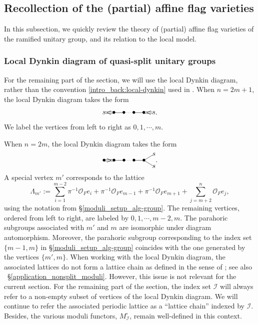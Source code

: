 \documentclass[pdflatex,sn-mathphys-num]{sn-jnl}%
\theoremstyle{thmstyleone}%
\theoremstyle{thmstyletwo}%
\numberwithin{equation}{subsection}
\theoremstyle{thmstylethree}%
\newcommand{\CI}{\ensuremath{\mathcal{I}}\xspace}
\newcommand{\CO}{\ensuremath{\mathcal{O}}\xspace}
\begin{document}
\subsection{Recollection of the (partial) affine flag varieties}
In this subsection, we quickly review the theory of (partial) affine flag varieties of the ramified unitary group, and its relation to the local model.
		
\subsubsection{Local Dynkin diagram of quasi-split unitary groups}\label{general_dyn}
For the remaining part of the section, we will use the local Dynkin diagram, rather than the convention \eqref{intro_back:local-dynkin} used in \cite[4.a]{PR2008}.
When $n=2m+1$, the local Dynkin diagram takes the form
\begin{equation*}
	\xy 
	(-10,0)*{s}="s1";
	(-5,0)*{\bullet};
	(0,0)*{\bullet};
	(5,0)*{\bullet};
	(10,0)*{\bullet};
	(15,0)*{s}="s2";
	(-7.5,0)*{<};
	(12.5,0)*{<};
	{\ar@2{-} "s1";(-5,0)};
	{\ar@{-} (-5,0);(0,0)};
	{\ar@{.} (0,0);(5,0)};
	{\ar@{-} (5,0);(10,0)};
	{\ar@2{-} (10,0);"s2"};
	\endxy.
\end{equation*}
We label the vertices from left to right as $0,1,\cdots,m$.
		
When $n=2m$, the local Dynkin diagram takes the form 
\begin{equation*}
	\xy 
	(-10,0)*{\bullet}="v1";
	(-5,0)*{\bullet}="v2";
	(0,0)*{\bullet}="v3";
	(5,0)*{\bullet}="v4";
	(10,0)*{\bullet}="v5";
	(15,3)*{s}="s1";
	(15,-3)*{s}="s2";
	(-7.5,0)*{>};
	{\ar@2{-} (-10,0);(-5,0)};
	{\ar@{-} (-5,0);(0,0)};
	{\ar@{.} (0,0);(5,0)};
	{\ar@{-} (5,0);(10,0)};
	{\ar@{-} (10,0);"s1"};
	{\ar@{-} (10,0);"s2"};
	\endxy.
\end{equation*}
A special vertex $m'$ corresponds to the lattice
\begin{equation*}
	\Lambda_{m'}:=\sum_{i=1}^{m-2}\pi^{-1}\CO_F e_i+\pi^{-1}\CO_F e_{m-1}+\pi^{-1}\CO_{F}e_{m+1}+\sum_{j=m+2}^n\CO_F e_{j},
\end{equation*}
using the notation from \S \ref{moduli_setup_alg-group}. The remaining vertices, ordered from left to right, are labeled by ${0,1,\cdots,m-2,m}$.
The parahoric subgroups associated with $m'$ and $m$ are isomorphic under diagram automorphism. 
Moreover, the parahoric subgroup corresponding to the index set $\{m-1,m\}$ in \S \ref{moduli_setup_alg-group} coincides with the one generated by the vertices $\{m',m\}$.
When working with the local Dynkin diagram, the associated lattices do not form a lattice chain as defined in the sense of \cite[Definition 3.1]{RZ}; see also \ \S \ref{application_nonsplit_moduli}. However, this issue is not relevant for the current section.
For the remaining part of the section, the index set $\CI$ will always refer to a non-empty subset of vertices of the local Dynkin diagram. 
We will continue to refer the associated periodic lattice as a ``lattice chain'' indexed by $\CI$. 
Besides, the various moduli functors, $M_\CI^\square$, remain well-defined in this context.
\end{document}

